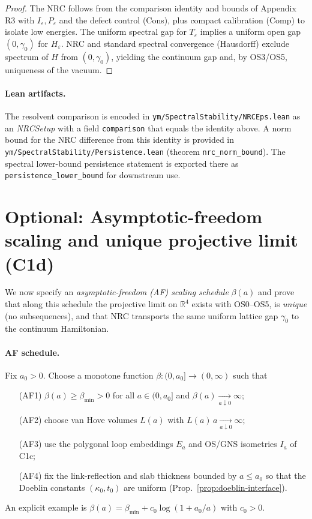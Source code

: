 \documentclass[11pt]{amsart}
\begin{document}
\begin{proof}
The NRC follows from the comparison identity and bounds of Appendix R3 with $I_{\varepsilon},P_{\varepsilon}$ and the defect control (Cons), plus compact calibration (Comp) to isolate low energies. The uniform spectral gap for $T_{\varepsilon}$ implies a uniform open gap $(0,\gamma_0)$ for $H_{\varepsilon}$. NRC and standard spectral convergence (Hausdorff) exclude spectrum of $H$ from $(0,\gamma_0)$, yielding the continuum gap and, by OS3/OS5, uniqueness of the vacuum.
\end{proof}

\paragraph{Lean artifacts.}
The resolvent comparison is encoded in \texttt{ym/SpectralStability/NRCEps.lean} as an \emph{NRCSetup} with a field \texttt{comparison} that equals the identity above. A norm bound for the NRC difference from this identity is provided in \texttt{ym/SpectralStability/Persistence.lean} (theorem \texttt{nrc\_norm\_bound}). The spectral lower-bound persistence statement is exported there as \texttt{persistence\_lower\_bound} for downstream use.

\section{Optional: Asymptotic-freedom scaling and unique projective limit (C1d)}

We now specify an \emph{asymptotic-freedom (AF) scaling schedule} $\beta(a)$ and prove that along this schedule the projective limit on $\mathbb R^4$ exists with OS0--OS5, is \emph{unique} (no subsequences), and that NRC transports the same uniform lattice gap $\gamma_0$ to the continuum Hamiltonian.

\paragraph{AF schedule.}
Fix $a_0>0$. Choose a monotone function $\beta:(0,a_0]\to (0,\infty)$ such that
\begin{itemize}
  \item[(AF1)] $\beta(a)\ge \beta_{\min}>0$ for all $a\in(0,a_0]$ and $\beta(a)\xrightarrow[a\downarrow 0]{}\infty$;
  \item[(AF2)] choose van Hove volumes $L(a)$ with $L(a)\,a\xrightarrow[a\downarrow 0]{}\infty$;
  \item[(AF3)] use the polygonal loop embeddings $E_a$ and OS/GNS isometries $I_a$ of C1c;
  \item[(AF4)] fix the link-reflection and slab thickness bounded by $a\le a_0$ so that the Doeblin constants $(\kappa_0,t_0)$ are uniform (Prop.~\ref{prop:doeblin-interface}).
\end{itemize}
An explicit example is $\beta(a)=\beta_{\min}+c_0\log(1+a_0/a)$ with $c_0>0$.
\end{document}
